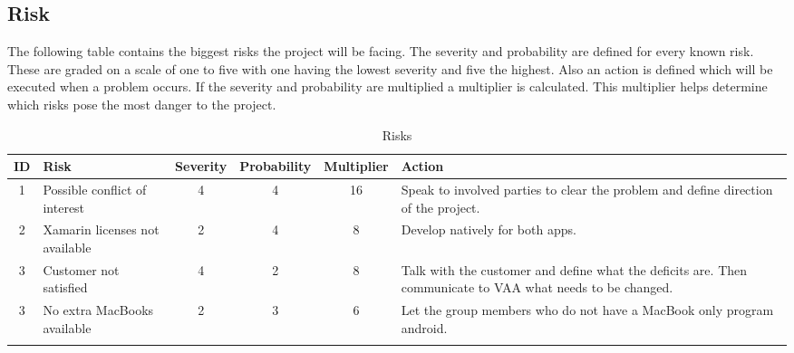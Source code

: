 \subsection{Risk}
The following table contains the biggest risks the project will be facing. The severity and probability are defined for every known risk. These are graded on a scale of one to five with one having the lowest severity and five the highest. Also an action is defined which will be executed when a problem occurs. If the severity and probability are multiplied a multiplier is calculated. This multiplier helps determine which risks pose the most danger to the project.

\begin{longtable}{ c p{3cm} c c c p{4cm} }
	\textbf{ID} & \textbf{Risk} & \textbf{Severity} & \textbf{Probability} & \textbf{Multiplier} & \textbf{Action} \\ \hline
	1 & Possible conflict of interest  & 4 & 4 & 16 & Speak to involved parties to clear the problem and define direction of the project. \\
	2 & Xamarin licenses not available & 2 & 4 & 8 & Develop natively for both apps. \\
	3 & Customer not satisfied  & 4 & 2 & 8 & Talk with the customer and define what the deficits are. Then communicate to VAA what needs to be changed.\\
	3 & No extra MacBooks available  & 2 & 3 & 6 & Let the group members who do not have a MacBook only program android. \\	
	\caption{Risks\label{risk}}
\end{longtable}